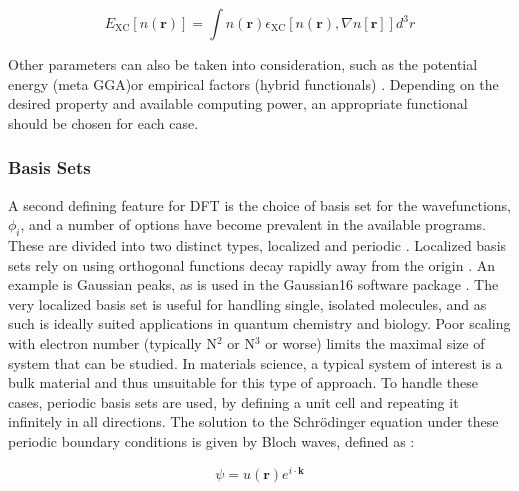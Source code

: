 \begin{equation}
E_{\mathrm{XC}}[n(\textbf{r})] = \int  n(\textbf{r}) \epsilon_{\mathrm{XC}}[n(\textbf{r}), \nabla n[\textbf{r}]] d^3r
\end{equation}


Other parameters can also be taken into consideration, such as the potential energy (meta GGA)or empirical factors (hybrid functionals) \cite{tao_climbing_2003, bj_pot}.  Depending on the desired property and available computing power, an appropriate functional should be chosen for each case.


\subsubsection{Basis Sets}
A second defining feature for DFT is the choice of basis set for the wavefunctions, $\phi_i$, and a number of options have become prevalent in the available programs.  These are divided into two distinct types, localized and periodic \cite{sholl_density_2009}.  Localized basis sets rely on using orthogonal functions decay rapidly away from the origin \cite{sholl_density_2009}.  An example is Gaussian peaks, as is used in the Gaussian16 software package \cite{g16}.  The very localized basis set is useful for handling single, isolated molecules, and as such is ideally suited applications in quantum chemistry and biology. Poor scaling with electron number (typically N$^2$ or N$^3$ or worse) limits the maximal size of system that can be studied.  In materials science, a typical system of interest is a bulk material and thus unsuitable for this type of approach.  To handle these cases, periodic basis sets are used, by defining a unit cell and repeating it infinitely in all directions.  The solution to the Schr\"odinger equation under these periodic boundary conditions is given by Bloch waves, defined as \cite{griffiths}:

\begin{equation}
	\psi = u(\textbf{r}) e^{i\cdot \textbf{k}}
\end{equation}

